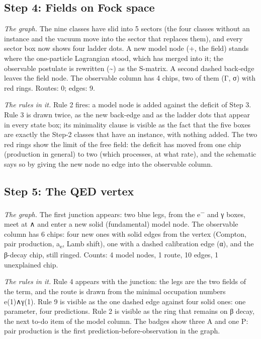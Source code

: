 \subsection*{Step 4: Fields on Fock space}
\noindent\emph{The graph.} The nine classes have slid into 5 sectors (the four classes without an instance and the vacuum move into the sector that replaces them), and every sector box now shows four ladder dots. A new model node (+, the field) stands where the one-particle Lagrangian stood, which has merged into it; the observable postulate is rewritten (\textasciitilde{}) as the S-matrix. A second dashed back-edge leaves the field node. The observable column has 4 chips, two of them (Γ, σ) with red rings. Routes: 0; edges: 9.

\noindent\emph{The rules in it.} Rule 2 fires: a model node is added against the deficit of Step 3. Rule 3 is drawn twice, as the new back-edge and as the ladder dots that appear in every state box; its minimality clause is visible as the fact that the five boxes are exactly the Step-2 classes that have an instance, with nothing added. The two red rings show the limit of the free field: the deficit has moved from one chip (production in general) to two (which processes, at what rate), and the schematic says so by giving the new node no edge into the observable column.

\subsection*{Step 5: The QED vertex}
\noindent\emph{The graph.} The first junction appears: two blue legs, from the e\textsuperscript{−} and γ boxes, meet at ∧ and enter a new solid (fundamental) model node. The observable column has 6 chips: four new ones with solid edges from the vertex (Compton, pair production, a\textsubscript{e}, Lamb shift), one with a dashed calibration edge (α), and the β-decay chip, still ringed. Counts: 4 model nodes, 1 route, 10 edges, 1 unexplained chip.

\noindent\emph{The rules in it.} Rule 4 appears with the junction: the legs are the two fields of the term, and the route is drawn from the minimal occupation numbers e(1)∧γ(1). Rule 9 is visible as the one dashed edge against four solid ones: one parameter, four predictions. Rule 2 is visible as the ring that remains on β decay, the next to-do item of the model column. The badges show three A and one P: pair production is the first prediction-before-observation in the graph.

